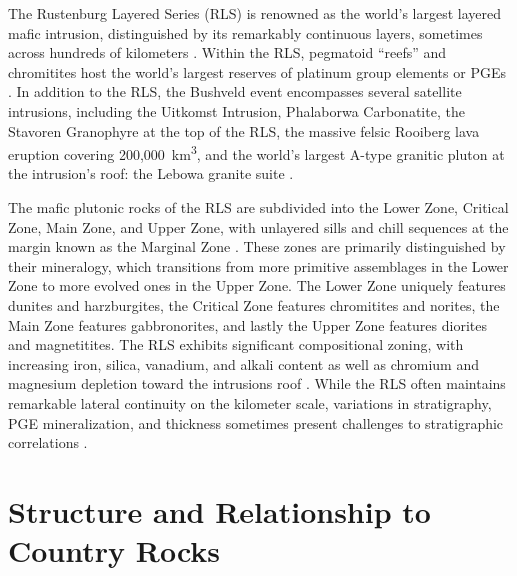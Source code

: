The Rustenburg Layered Series (RLS) is renowned as the
world's largest layered mafic intrusion, distinguished
by its remarkably continuous layers, sometimes across hundreds of
kilometers \citep{cawthorn2015,latypovetal2022,scoon1994}. Within the RLS, pegmatoid ``reefs'' and chromitites host the
world's largest reserves of platinum group elements or
PGEs \citep{lee1996}. In addition to the RLS, the Bushveld event
encompasses several satellite intrusions, including the Uitkomst
Intrusion, Phalaborwa Carbonatite, the Stavoren Granophyre at the top of
the RLS, the massive felsic Rooiberg lava eruption covering 200,000~km\textsuperscript{3},
and the world's largest A-type granitic pluton at the
intrusion's roof: the Lebowa granite suite \citep{hill1996,kleemann1989,scoates2021,walraven1985}.

The mafic plutonic rocks of the RLS are subdivided into the Lower Zone,
Critical Zone, Main Zone, and Upper Zone, with unlayered sills and chill
sequences at the margin known as the Marginal Zone \citep{vongruenewaldt1985}. These zones are primarily distinguished by their mineralogy,
which transitions from more primitive assemblages in the Lower Zone to
more evolved ones in the Upper Zone. The Lower Zone uniquely features
dunites and harzburgites, the Critical Zone features chromitites and
norites, the Main Zone features gabbronorites, and lastly the Upper Zone
features diorites and magnetitites. The RLS exhibits significant
compositional zoning, with increasing iron, silica, vanadium, and alkali
content as well as chromium and magnesium depletion toward the
intrusion\textquotesingle s roof \citep{cawthorn2015}. While the RLS often
maintains remarkable lateral continuity on the kilometer scale,
variations in stratigraphy, PGE mineralization, and thickness sometimes
present challenges to stratigraphic correlations \citep{ashwal2005,mcdonald2005,scoon1994}.

\section{Structure and Relationship to Country Rocks}
\label{sec:ch5-structure-and-relationship-to-country-rocks}

